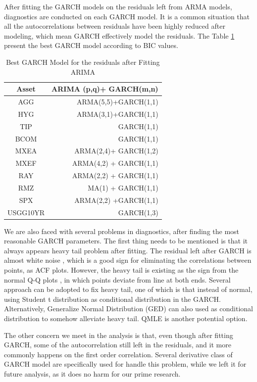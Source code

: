 \documentclass[12pt]{article}
\begin{document}
After fitting the GARCH models on the residuals left from ARMA models, diagnostics are conducted on each GARCH model. It is a common situation that all the autocorrelations between residuals have been highly reduced after modeling, which mean GARCH effectively model the residuals. The Table \ref{table:BestGarch} present the best GARCH model according to BIC values. 

\begin{table}[!h]
\caption{Best GARCH Model for the residuals after Fitting ARIMA}
\centering 
\begin{tabular}{ | c || r | } 
 \hline
Asset & ARIMA (p,q)+ GARCH(m,n) \\
  \hline \hline
AGG & ARMA(5,5)+GARCH(1,1) \\ 
HYG & ARMA(3,1)+GARCH(1,1) \\ 
TIP &  GARCH(1,1)\\ 
BCOM & GARCH(1,1)\\ 
MXEA & ARMA(2,4)+ GARCH(1,2) \\ 
MXEF & ARMA(4,2) + GARCH(1,1)\\ 
RAY &  ARMA(2,2) + GARCH(1,1)\\ 
RMZ & MA(1) + GARCH(1,1) \\ 
SPX & ARMA(2,2) +GARCH(1,1)\\ 
USGG10YR & GARCH(1,3) \\
 \hline
\end{tabular}
\label{table:BestGarch}
\end{table}


 We are also faced with several problems in diagnostics, after finding the most reasonable GARCH parameters. The first thing needs to be mentioned is that it always appears heavy tail problem after fitting.  The residual left after GARCH is almost white noise  , which is a good sign for eliminating the correlations between points, as ACF plots. However, the heavy tail is existing as the sign from the normal Q-Q plots   , in which points deviate from line at both ends. Several approach can be adopted to fix heavy tail, one of which is that instead of normal, using Student t distribution as conditional distribution in the GARCH. Alternatively, Generalize Normal Distribution (GED) can also used as conditional distribution to somehow alleviate heavy tail. QMLE is another potential option. 
 
 The other concern we meet in the analysis is that, even though after fitting GARCH, some of the autocorrelation still left in the residuals, and it more commonly happens on the first order correlation. Several derivative class of GARCH model are specifically used for handle this problem, while we left it for future analysis, as it does no harm for our prime research.
\end{document}
